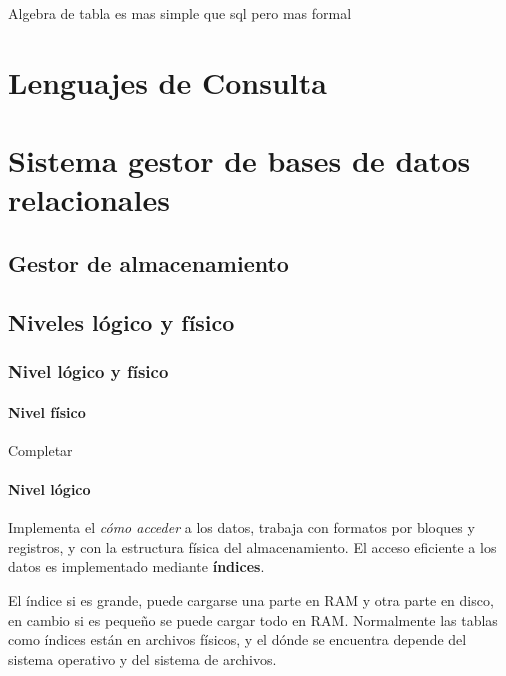 \newpage
{}

Algebra de tabla es mas simple que sql pero mas formal

\section{Lenguajes de Consulta}

\section{Sistema gestor de bases de datos relacionales}

\subsection{Gestor de almacenamiento}

\subsection{Niveles lógico y físico}

\subsubsection{Nivel lógico y físico}

\paragraph{Nivel físico}
Completar

\paragraph{Nivel lógico}
Implementa el \textit{cómo acceder} a los datos, trabaja con formatos por bloques y registros, y con la estructura física del almacenamiento. El acceso eficiente a los datos es implementado mediante \textbf{índices}.

El índice si es grande, puede cargarse una parte en RAM y otra parte en disco, en cambio si es pequeño se puede cargar todo en RAM. Normalmente las tablas como índices están en archivos físicos, y el dónde se encuentra depende del sistema operativo y del sistema de archivos.

